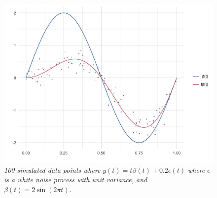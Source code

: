 



{ }

\begin{figure}[H]
   \graphicspath{{img/}}
   \centering
  \includegraphics[scale=0.25]{PS_VCM_section_figure_1.png}
\caption{\textit{100 simulated data points where} $y\left(t\right) = t \beta\left( t \right) + 0.2\epsilon\left(t\right)$ \textit{where} $\epsilon$ \textit{is a white noise process with unit variance, and} $\beta\left(t\right) = 2\sin\left(2\pi t\right)$.}
\label{fig:PS_VCM_section_figure_1}
\end{figure}

